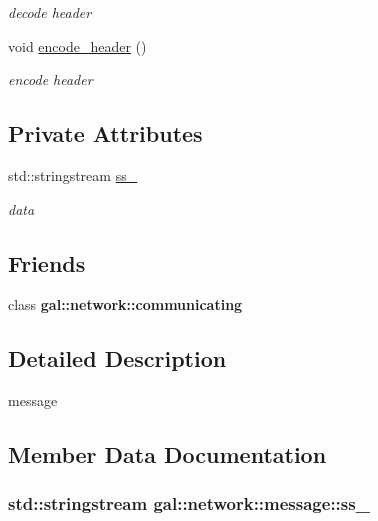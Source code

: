 \begin{DoxyCompactItemize}
\begin{DoxyCompactList}\small\item\em decode header \end{DoxyCompactList}\item 
\hypertarget{classgal_1_1network_1_1message_a1bf10df7093930f183100b78a0251cd2}{void \hyperlink{classgal_1_1network_1_1message_a1bf10df7093930f183100b78a0251cd2}{encode\-\_\-header} ()}\label{classgal_1_1network_1_1message_a1bf10df7093930f183100b78a0251cd2}

\begin{DoxyCompactList}\small\item\em encode header \end{DoxyCompactList}\end{DoxyCompactItemize}
\subsection*{\-Private \-Attributes}
\begin{DoxyCompactItemize}
\item 
std\-::stringstream \hyperlink{classgal_1_1network_1_1message_a939d7b5d4f7dd24dbe4dd4be8e719da8}{ss\-\_\-}
\begin{DoxyCompactList}\small\item\em data \end{DoxyCompactList}\end{DoxyCompactItemize}
\subsection*{\-Friends}
\begin{DoxyCompactItemize}
\item 
\hypertarget{classgal_1_1network_1_1message_a8963f6c475f2812300781c41bc93ae55}{class {\bfseries gal\-::network\-::communicating}}\label{classgal_1_1network_1_1message_a8963f6c475f2812300781c41bc93ae55}

\end{DoxyCompactItemize}


\subsection{\-Detailed \-Description}
message 

\subsection{\-Member \-Data \-Documentation}
\hypertarget{classgal_1_1network_1_1message_a939d7b5d4f7dd24dbe4dd4be8e719da8}{
\subsubsection[{ss\-\_\-}]{\setlength{\rightskip}{0pt plus 5cm}std\-::stringstream {\bf gal\-::network\-::message\-::ss\-\_\-}}}\label{classgal_1_1network_1_1message_a939d7b5d4f7dd24dbe4dd4be8e719da8}


